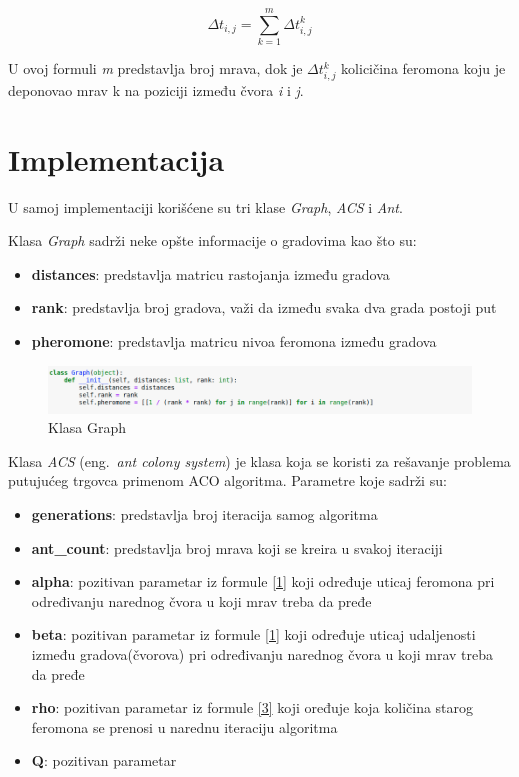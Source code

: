 \documentclass[a4paper]{article}
\begin{document}
{\begin{equation}\label{4}
\Delta t_{i,j}  = \sum_{k=1}^{m} \Delta t^k_{i,j}
\end{equation}

U ovoj formuli \textit{m} predstavlja broj mrava, dok je $\Delta t^k_{i,j}$ kolicičina feromona koju je deponovao mrav k na poziciji između čvora \textit{i} i \textit{j}.

\section{Implementacija}
\label{sec:naslov1}

U samoj implementaciji korišćene su tri klase \textit{Graph}, \textit{ACS} i \textit{Ant}. 

Klasa \textit{Graph} sadrži neke opšte informacije o gradovima kao što su:
\begin{itemize}
  \item \textbf{distances}: predstavlja matricu rastojanja između gradova
  \item \textbf{rank}: predstavlja broj gradova, važi da između svaka dva grada postoji put
  \item \textbf{pheromone}: predstavlja matricu nivoa feromona između gradova 
\end{itemize}

\begin{figure}[h!]
\begin{center}
\includegraphics[width=1\columnwidth]{slika1.png}
\end{center}
\caption{Klasa Graph}
\label{fig:slika1}
\end{figure}

Klasa \textit{ACS} (eng.~{\em ant colony system}) je klasa koja se koristi za rešavanje problema putujućeg trgovca primenom ACO algoritma. Parametre koje sadrži su:

\begin{itemize}
	\item \textbf{generations}: predstavlja broj iteracija samog algoritma
	\item \textbf{ant\_count}: predstavlja broj mrava koji se kreira u svakoj iteraciji
	\item \textbf{alpha}: pozitivan parametar iz formule \ref{1} koji određuje uticaj feromona pri određivanju narednog čvora u koji mrav treba da pređe
	\item \textbf{beta}: pozitivan parametar iz formule \ref{1} koji određuje uticaj udaljenosti između gradova(čvorova) pri određivanju narednog čvora u koji mrav treba da pređe
	\item \textbf{rho}: pozitivan parametar iz formule \ref{3} koji oređuje koja količina starog feromona se prenosi u narednu iteraciju algoritma
	\item \textbf{Q}: pozitivan parametar
		

\end{itemize}}
\end{document}
